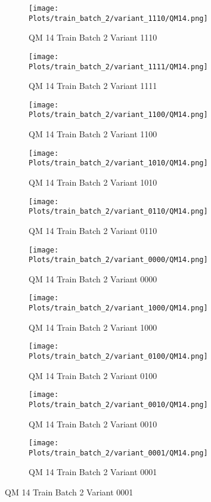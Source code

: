 \documentclass{DissertateFigs}
\begin{document}
\begin{figure}[t!]
    \begin{subfigure}{0.47\textwidth}
    \texttt{[image: Plots/train\_batch\_2/variant\_1110/QM14.png]}
    \caption{QM 14 Train Batch 2 Variant 1110}
    \end{subfigure}
    \begin{subfigure}{0.47\textwidth}
    \texttt{[image: Plots/train\_batch\_2/variant\_1111/QM14.png]}
    \caption{QM 14 Train Batch 2 Variant 1111}
    \end{subfigure}

\medskip

    \begin{subfigure}{0.47\textwidth}
    \texttt{[image: Plots/train\_batch\_2/variant\_1100/QM14.png]}
    \caption{QM 14 Train Batch 2 Variant 1100}
    \end{subfigure}
    \begin{subfigure}{0.47\textwidth}
    \texttt{[image: Plots/train\_batch\_2/variant\_1010/QM14.png]}
    \caption{QM 14 Train Batch 2 Variant 1010}
    \end{subfigure}

\medskip

    \begin{subfigure}{0.47\textwidth}
    \texttt{[image: Plots/train\_batch\_2/variant\_0110/QM14.png]}
    \caption{QM 14 Train Batch 2 Variant 0110}
    \end{subfigure}
    \begin{subfigure}{0.47\textwidth}
    \texttt{[image: Plots/train\_batch\_2/variant\_0000/QM14.png]}
    \caption{QM 14 Train Batch 2 Variant 0000}
    \end{subfigure}

\medskip

    \begin{subfigure}{0.47\textwidth}
    \texttt{[image: Plots/train\_batch\_2/variant\_1000/QM14.png]}
    \caption{QM 14 Train Batch 2 Variant 1000}
    \end{subfigure}
    \begin{subfigure}{0.47\textwidth}
    \texttt{[image: Plots/train\_batch\_2/variant\_0100/QM14.png]}
    \caption{QM 14 Train Batch 2 Variant 0100}
    \end{subfigure}

\medskip

    \begin{subfigure}{0.47\textwidth}
    \texttt{[image: Plots/train\_batch\_2/variant\_0010/QM14.png]}
    \caption{QM 14 Train Batch 2 Variant 0010}
    \end{subfigure}
    \begin{subfigure}{0.47\textwidth}
    \texttt{[image: Plots/train\_batch\_2/variant\_0001/QM14.png]}
    \caption{QM 14 Train Batch 2 Variant 0001}
    \end{subfigure}


\end{figure}
\end{document}
